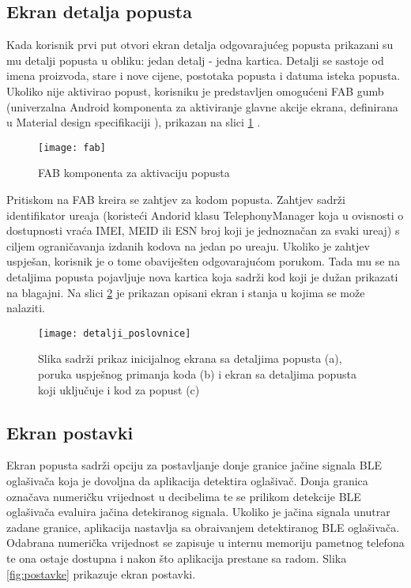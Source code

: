 \subsection{Ekran detalja popusta}

Kada korisnik prvi put otvori ekran detalja odgovaraju\'{c}eg popusta prikazani su mu detalji popusta u obliku: jedan detalj -  jedna kartica. Detalji se sastoje od imena proizvoda, stare i nove cijene, postotaka popusta i datuma isteka popusta. Ukoliko nije aktivirao popust, korisniku je predstavljen omogu\'{c}eni FAB gumb (univerzalna Android komponenta za aktiviranje glavne akcije ekrana, definirana u Material design specifikaciji \cite{materialDesign}), prikazan na slici \ref{fig:fab} .

\begin{figure}[!htbp]
	\begin{center}
 \texttt{[image: fab]}
 \caption{FAB komponenta za aktivaciju popusta}
 \label{fig:fab}
	\end{center}
\end{figure}


Pritiskom na FAB kreira se zahtjev za kodom popusta. Zahtjev sadr\v{z}i identifikator ure\dj aja (koriste\'{c}i Andorid klasu TelephonyManager \cite{telephonyManager} koja u ovisnosti o dostupnosti vra\'{c}a IMEI, MEID ili ESN broj koji je jednozna\v{c}an za svaki ure\dj aj) s ciljem ograni\v{c}avanja izdanih kodova na jedan po ure\dj aju. Ukoliko je zahtjev uspje\v{s}an, korisnik je o tome obavije\v{s}ten odgovaraju\'{c}om porukom. Tada mu se na detaljima popusta pojavljuje nova kartica koja sadr\v{z}i kod koji je du\v{z}an prikazati na blagajni. Na slici \ref{fig:detalji_poslovnice} je prikazan opisani ekran i stanja u kojima se mo\v{z}e nalaziti.

\begin{figure}[!htbp]
	\begin{center}
 \texttt{[image: detalji\_poslovnice]}
 \caption{Slika sadr\v{z}i prikaz inicijalnog ekrana sa detaljima popusta (a), poruka uspje\v{s}nog primanja koda (b) i ekran sa detaljima popusta koji uklju\v{c}uje i kod za popust (c)}
 \label{fig:detalji_poslovnice}
	\end{center}
\end{figure}


\subsection{Ekran postavki}
Ekran popusta sadr\v{z}i opciju za postavljanje donje granice ja\v{c}ine signala BLE ogla\v{s}iva\v{c}a koja je dovoljna da aplikacija detektira ogla\v{s}iva\v{c}. Donja granica ozna\v{c}ava numeri\v{c}ku vrijednost u decibelima te se prilikom detekcije BLE ogla\v{s}iva\v{c}a evaluira ja\v{c}ina detekiranog signala. Ukoliko je ja\v{c}ina signala unutrar zadane granice, aplikacija nastavlja sa obra\dj ivanjem detektiranog BLE ogla\v{s}iva\v{c}a. Odabrana numeri\v{c}ka vrijednost se zapisuje u internu memoriju pametnog telefona te ona ostaje dostupna i nakon \v{s}to aplikacija prestane sa radom. Slika \ref{fig:postavke} prikazuje ekran postavki.

